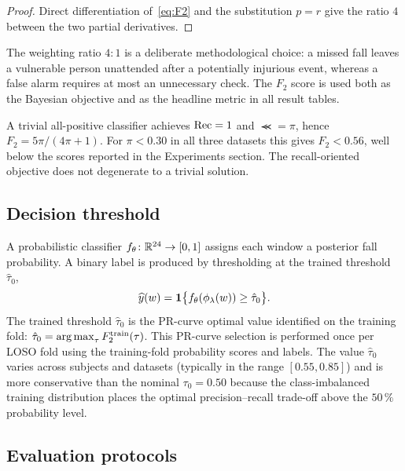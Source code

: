 \begin{proof}
Direct differentiation of~\eqref{eq:F2} and the substitution $p=r$ give the ratio $4$ between the two partial derivatives.
\end{proof}

The weighting ratio $4{:}1$ is a deliberate methodological choice: a missed fall leaves a vulnerable person unattended after a potentially injurious event, whereas a false alarm requires at most an unnecessary check. The $F_2$ score is used both as the Bayesian objective and as the headline metric in all result tables.

\begin{remark}
\label{rem:f2-baseline}
A trivial all-positive classifier achieves $\operatorname{Rec}=1$ and $\Prec=\pi$, hence $F_2=5\pi/(4\pi+1)$. For $\pi<0.30$ in all three datasets this gives $F_2<0.56$, well below the scores reported in the Experiments section. The recall-oriented objective does not degenerate to a trivial solution.
\end{remark}

\subsection{Decision threshold}
\label{subsubsec:threshold}

A probabilistic classifier $f_\theta\colon\mathbb{R}^{24}\to[0,1]$ assigns each window a posterior fall probability. A binary label is produced by thresholding at the trained threshold $\hat\tau_0$,
\begin{equation}
  \widehat y(w)=\mathbf{1}\bigl\{f_\theta(\phi_\lambda(w))\geq\hat\tau_0\bigr\}.
  \label{eq:dec-thresh}
\end{equation}
The trained threshold $\hat\tau_0$ is the PR-curve optimal value identified on the training fold: $\hat\tau_0=\operatorname*{arg\,max}_{\tau}F_2^{\mathrm{train}}(\tau)$. This PR-curve selection is performed once per LOSO fold using the training-fold probability scores and labels. The value $\hat\tau_0$ varies across subjects and datasets (typically in the range $[0.55, 0.85]$) and is more conservative than the nominal $\tau_0=0.50$ because the class-imbalanced training distribution places the optimal precision--recall trade-off above the $50\,\%$ probability level.

\subsection{Evaluation protocols}
\label{subsubsec:protocols}

